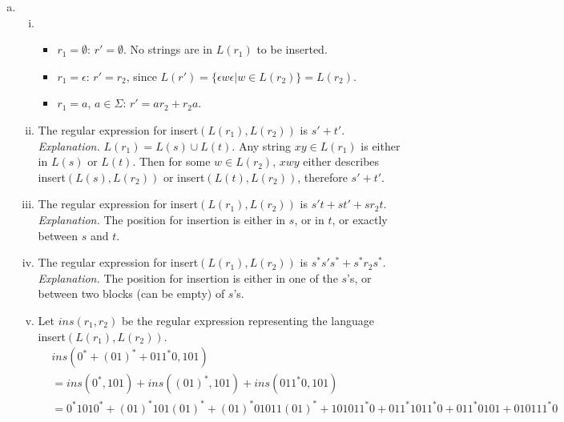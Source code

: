 \documentclass[11pt]{article}
\begin{document}
\begin{solution}
\begin{enumerate}[(a)]
\item
\begin{enumerate}[i.]
\item
\begin{itemize}
\item $r_1=\emptyset$: $r'=\emptyset$. No strings are in $L(r_1)$ to be inserted.
\item $r_1=\epsilon$: $r'=r_2$, since $L(r')=\{\epsilon w \epsilon | w\in L(r_2)\}=L(r_2)$.
\item $r_1=a$, $a\in \Sigma$: $r'=ar_2 + r_2a$.
\end{itemize}
\item The regular expression for insert$(L(r_1), L(r_2))$ is $s'+t'$.\\
\emph{Explanation. }$L(r_1)=L(s)\cup L(t)$. Any string $xy\in L(r_1)$ is either in $L(s)$ or $L(t)$. Then for some $w\in L(r_2)$, $xwy$ either describes insert$(L(s), L(r_2))$ or insert$(L(t), L(r_2))$, therefore $s'+t'$.
\item The regular expression for insert$(L(r_1), L(r_2))$ is $s't+st'+sr_2t$.\\
\emph{Explanation. }The position for insertion is either in $s$, or in $t$, or exactly between $s$ and $t$.
\item The regular expression for insert$(L(r_1), L(r_2))$ is $s^*s's^* + s^*r_2s^*$.\\
\emph{Explanation. }The position for insertion is either in one of the $s$'s, or between two blocks (can be empty) of $s$'s.
\item Let $ins(r_1, r_2)$ be the regular expression representing the language insert$(L(r_1), L(r_2))$.
\begin{align*}
&ins(0^*+(01)^* + 011^*0, 101)\\
&= ins(0^*, 101) + ins((01)^*, 101) + ins(011^*0, 101)\\
&= 0^*1010^* + (01)^*101(01)^* + (01)^*01011(01)^* + 101011^*0 + 011^*1011^*0 + 011^*0101 + 010111^*0
\end{align*}
\end{enumerate}
\end{enumerate}
\end{solution}
\end{document}

